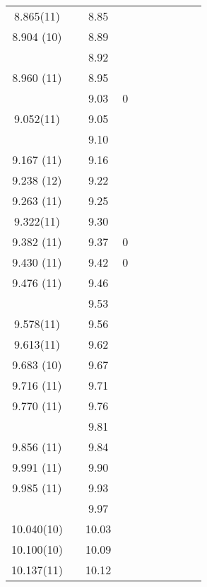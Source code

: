 \begin{landscape}
\begin{center}
\begin{longtable}{cc cc cc cc cc}
   8.865(11)    &   & 8.85  &   &   &   &   &   &   &   \\
  8.904 (10)    &   & 8.89  &   &   &   &   &   &   &   \\
  &   & 8.92  &   &   &   &   &   &   &   \\
  8.960 (11)    &   & 8.95  &   &   &   &   &   &   &   \\
  &   & 9.03  & 0 &   &   &   &   &   &   \\
   9.052(11)    &   & 9.05  &   &   &   &   &   &   &   \\
  &   & 9.10  &   &   &   &   &   &   &   \\
  9.167 (11)    &   & 9.16  &   &   &   &   &   &   &   \\
  9.238 (12)    &   & 9.22  &   &   &   &   &   &   &   \\
  9.263 (11)    &   & 9.25  &   &   &   &   &   &   &   \\
   9.322(11)    &   & 9.30  &   &   &   &   &   &   &   \\
  9.382 (11)    &   & 9.37  & 0 &   &   &   &   &   &   \\
  9.430 (11)    &   & 9.42  & 0 &   &   &   &   &   &   \\
  9.476 (11)    &   & 9.46  &   &   &   &   &   &   &   \\
  &   & 9.53  &   &   &   &   &   &   &   \\
   9.578(11)    &   & 9.56  &   &   &   &   &   &   &   \\
   9.613(11)    &   & 9.62  &   &   &   &   &   &   &   \\
  9.683 (10)    &   & 9.67  &   &   &   &   &   &   &   \\
  9.716 (11)    &   & 9.71  &   &   &   &   &   &   &   \\
  9.770 (11)    &   & 9.76  &   &   &   &   &   &   &   \\
  &   & 9.81  &   &   &   &   &   &   &   \\
  9.856 (11)    &   & 9.84  &   &   &   &   &   &   &   \\
  9.991 (11)    &   & 9.90  &   &   &   &   &   &   &   \\
  9.985 (11)    &   & 9.93  &   &   &   &   &   &   &   \\
  &   & 9.97  &   &   &   &   &   &   &   \\
  10.040(10)    &   & 10.03 &   &   &   &   &   &   &   \\
  10.100(10)    &   & 10.09 &   &   &   &   &   &   &   \\
  10.137(11)    &   & 10.12 &   &   &   &   &   &   &   \\

\end{longtable}
\end{center}
\end{landscape}
